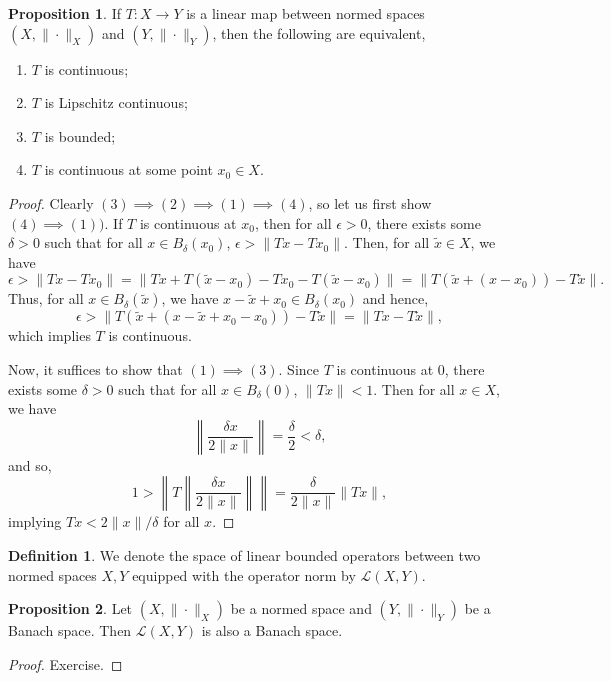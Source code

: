 \documentclass[]{article}
\theoremstyle{definition}
\theoremstyle{definition}
\newtheorem{definition}{Definition}[section]
\newtheorem{proposition}{Proposition}[section]
\begin{document}
\begin{proposition}
  If \(T : X \to Y\) is a linear map between normed spaces 
  \((X, \|\cdot\|_X)\) and \((Y, \|\cdot\|_Y)\), then the following are equivalent,
  \begin{enumerate}
    \item \(T\) is continuous;
    \item \(T\) is Lipschitz continuous;
    \item \(T\) is bounded;
    \item \(T\) is continuous at some point \(x_0 \in X\).
  \end{enumerate}
\end{proposition}
\begin{proof}
  Clearly \((3) \implies (2) \implies (1) \implies (4)\), so let us first show 
  \((4) \implies (1))\). If \(T\) is continuous at \(x_0\), then 
  for all \(\epsilon > 0\), there exists some \(\delta > 0\) such that 
  for all \(x \in B_\delta(x_0)\), \(\epsilon > \|Tx - Tx_0\|\).
  Then, for all \(\tilde x \in X\), we have 
  \[\epsilon > \|Tx - Tx_0\| = 
    \|Tx + T(\tilde x - x_0) - Tx_0 - T(\tilde x - x_0)\| =
    \|T(\tilde x + (x - x_0)) - T \tilde x\|.\]
  Thus, for all \(x \in B_\delta(\tilde x)\), we have 
  \(x - \tilde x + x_0 \in B_\delta(x_0)\) and hence,
  \[\epsilon > \|T(\tilde x + (x - \tilde x + x_0 - x_0)) - T \tilde x\| 
    = \|Tx - T\tilde x\|,\]
  which implies \(T\) is continuous. 

  Now, it suffices to show that \((1) \implies (3)\). Since \(T\) is continuous 
  at \(0\), there exists some \(\delta > 0\) such that for all 
  \(x \in B_\delta(0)\), \(\|Tx\| < 1\). Then for all \(x \in X\), we have 
  \[\left\|\frac{\delta x}{2\|x\|}\right\| = \frac{\delta}{2} < \delta,\]
  and so, 
  \[1 > \left\|T\left\|\frac{\delta x}{2\|x\|}\right\|\right\| = 
    \frac{\delta}{2\|x\|}\|Tx\|,\]
  implying \(Tx < 2\|x\| / \delta\) for all \(x\).
\end{proof}

\begin{definition}
  We denote the space of linear bounded operators between two normed spaces 
  \(X, Y\) equipped with the operator norm by \(\mathcal{L}(X, Y)\).
\end{definition}

\begin{proposition}
  Let \((X, \|\cdot\|_X)\) be a normed space and \((Y, \|\cdot\|_Y)\) be a 
  Banach space. Then \(\mathcal{L}(X, Y)\) is also a Banach space.
\end{proposition}
\begin{proof}
  Exercise.
\end{proof}
\end{document}
